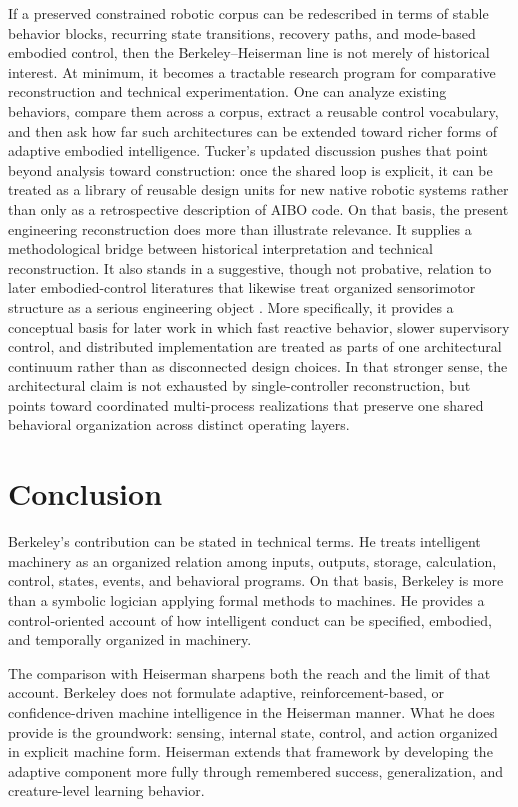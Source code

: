 \documentclass[11pt]{article}
\begin{document}
If a preserved constrained robotic corpus can be redescribed in terms of stable behavior blocks, recurring state transitions, recovery paths, and mode-based embodied control, then the Berkeley--Heiserman line is not merely of historical interest. At minimum, it becomes a tractable research program for comparative reconstruction and technical experimentation. One can analyze existing behaviors, compare them across a corpus, extract a reusable control vocabulary, and then ask how far such architectures can be extended toward richer forms of adaptive embodied intelligence. Tucker's updated discussion pushes that point beyond analysis toward construction: once the shared loop is explicit, it can be treated as a library of reusable design units for new native robotic systems rather than only as a retrospective description of AIBO code. On that basis, the present engineering reconstruction does more than illustrate relevance. It supplies a methodological bridge between historical interpretation and technical reconstruction. It also stands in a suggestive, though not probative, relation to later embodied-control literatures that likewise treat organized sensorimotor structure as a serious engineering object \citep{brooks1986robust,brooks1991intelligence,braitenberg1984vehicles}. More specifically, it provides a conceptual basis for later work in which fast reactive behavior, slower supervisory control, and distributed implementation are treated as parts of one architectural continuum rather than as disconnected design choices. In that stronger sense, the architectural claim is not exhausted by single-controller reconstruction, but points toward coordinated multi-process realizations that preserve one shared behavioral organization across distinct operating layers.

\section{Conclusion}

Berkeley's contribution can be stated in technical terms. He treats intelligent machinery as an
organized relation among inputs, outputs, storage, calculation, control, states, events, and
behavioral programs. On that basis, Berkeley is more than a symbolic logician applying formal
methods to machines. He provides a control-oriented account of how intelligent conduct can be
specified, embodied, and temporally organized in machinery.

The comparison with Heiserman sharpens both the reach and the limit of that account. Berkeley
does not formulate adaptive, reinforcement-based, or confidence-driven machine intelligence in the
Heiserman manner. What he does provide is the groundwork: sensing, internal state, control, and
action organized in explicit machine form. Heiserman extends that framework by developing the
adaptive component more fully through remembered success, generalization, and creature-level
learning behavior.
\end{document}
